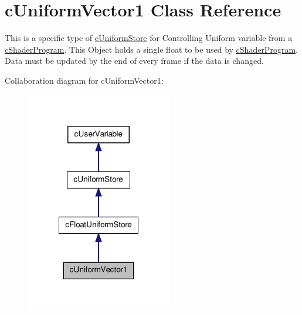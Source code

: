 \hypertarget{classc_uniform_vector1}{
\section{cUniformVector1 Class Reference}
\label{classc_uniform_vector1}
}


This is a specific type of \hyperlink{classc_uniform_store}{cUniformStore} for Controlling Uniform variable from a \hyperlink{classc_shader_program}{cShaderProgram}. This Object holds a single float to be used by \hyperlink{classc_shader_program}{cShaderProgram}. Data must be updated by the end of every frame if the data is changed.  




Collaboration diagram for cUniformVector1:\nopagebreak
\begin{figure}[H]
\begin{center}
\leavevmode
\includegraphics[width=180pt]{classc_uniform_vector1__coll__graph}
\end{center}
\end{figure}
